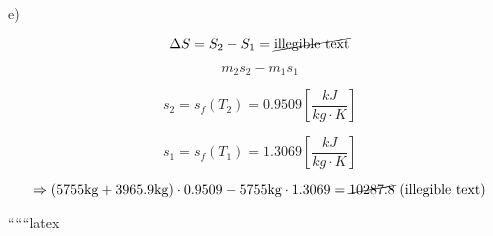 e)

\[
\Delta S = S_2 - S_1 = \cancel{\text{illegible text}}
\]

\[
m_2 s_2 - m_1 s_1
\]

\[
s_2 = s_f(T_2) = 0.9509 \left[\frac{kJ}{kg \cdot K}\right]
\]

\[
s_1 = s_f(T_1) = 1.3069 \left[\frac{kJ}{kg \cdot K}\right]
\]

\[
\Rightarrow (5755 \text{kg} + 3965.9 \text{kg}) \cdot 0.9509 - 5755 \text{kg} \cdot 1.3069 = \cancel{10287.8} \ (\text{illegible text})
\]

``````latex